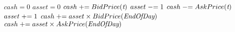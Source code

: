 \begin{algorithmic}[1]
\State $cash = 0$
\State $asset = 0$
		\State $cash \mathrel{+}= BidPrice(\textit{t})$
		\State $asset \mathrel{-}= 1$
		\State $cash \mathrel{-}= AskPrice(\textit{t})$	
		\State $asset \mathrel{+}= 1$
	\EndIf
\EndFor
{} 
	\State $cash \mathrel{+}= asset \times BidPrice(\textit{EndOfDay})$
	\State $cash \mathrel{+}= asset \times AskPrice(\textit{EndOfDay})$	
\EndIf
\end{algorithmic}
